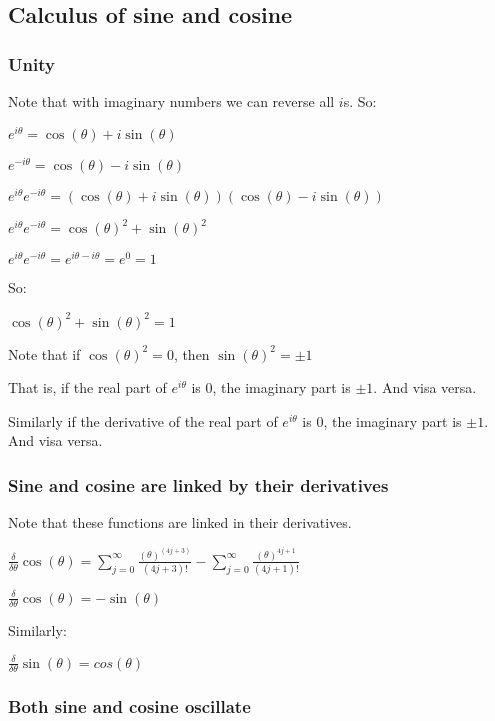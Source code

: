 
\subsection{Calculus of sine and cosine}

\subsubsection{Unity}

Note that with imaginary numbers we can reverse all \(i\)s. So:

\(e^{i\theta }=\cos (\theta )+i\sin (\theta )\)

\(e^{-i\theta }=\cos (\theta )-i\sin (\theta )\)

\(e^{i\theta }e^{-i\theta }=(\cos (\theta )+i\sin (\theta ))(\cos (\theta )-i\sin (\theta ))\)

\(e^{i\theta }e^{-i\theta }=\cos (\theta )^2+\sin (\theta )^2\)

\(e^{i\theta }e^{-i\theta }=e^{i\theta -i\theta }=e^0=1\)

So:

\(\cos (\theta )^2+\sin (\theta )^2=1\)

Note that if \(\cos (\theta )^2=0\), then \(\sin (\theta )^2=\pm 1\)

That is, if the real part of \(e^{i\theta }\) is \(0\), the imaginary part is \(\pm 1\). And visa versa.

Similarly if the derivative of the real part of \(e^{i\theta }\) is \(0\), the imaginary part is \(\pm 1\). And visa versa.

\subsubsection{Sine and cosine are linked by their derivatives}

Note that these functions are linked in their derivatives.

\(\frac{\delta }{\delta \theta }\cos (\theta )=\sum_{j=0}^\infty \frac{(\theta )^{(4j+3)}}{(4j+3)!}-\sum_{j=0}^\infty \frac{(\theta )^{4j+1}}{(4j+1)!}\)

\(\frac{\delta }{\delta \theta }\cos (\theta )=-\sin (\theta )\)

Similarly:

\(\frac{\delta }{\delta \theta }\sin (\theta )=cos(\theta )\)

\subsubsection{Both sine and cosine oscillate}

